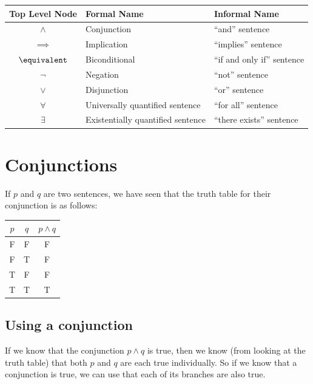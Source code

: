 \begin{table}[h]
	\centering
	\begin{tabular}{c|l|l}
	Top Level Node & Formal Name & Informal Name 	\\ \hline
	$\wedge$ & Conjunction & ``and'' sentence\\ \hline
	$\implies$ & Implication & ``implies'' sentence\\ \hline
	$\equivalent$ & Biconditional & ``if and only if'' sentence\\ \hline
	$\neg$ & Negation & ``not'' sentence\\ \hline
	$\vee$ & Disjunction & ``or'' sentence\\ \hline
	$\forall$ & Universally quantified sentence & ``for all'' sentence\\ \hline
	$\exists$ & Existentially quantified sentence & ``there exists'' sentence\\ \hline
	\end{tabular}
\end{table}

 \newpage

\section{Conjunctions}

If $p$ and $q$ are two sentences, we have seen that the truth table for their conjunction is as follows:

\begin{table}[h]
	\centering
	\begin{tabular}{c|c|c}
		$p$ & $q$ & $p \wedge q$ 	\\ \hline
		F & F & F 	\\ \hline
		F & T & F 	\\ \hline
		T & F & F 	\\ \hline
		T &  T & T 	\\ \hline
	\end{tabular}
\end{table}

\subsection{Using a conjunction}  If we know that the conjunction $p \wedge q$ is true, then we know (from looking at the truth table) that both $p$ and $q$ are each true individually.  So if we know that a conjunction is true, we can use that each of its branches are also true.

